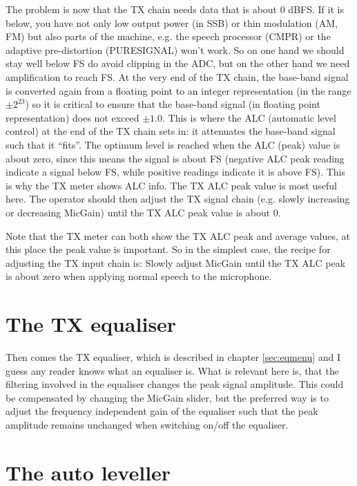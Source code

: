 \documentclass[12pt]{book}
\begin{document}
The problem is now that the TX chain needs data that is about 0 dBFS. If it is below, you have not only
low output power (in SSB) or thin modulation (AM, FM) but also parts of the machine, e.g. the speech
processor (CMPR) or the adaptive pre-distortion (PURESIGNAL) won't work.
So on one hand we should stay
well below FS do avoid clipping in the ADC, but on the other hand we need amplification to reach FS.
At the very end of the TX chain, the base-band signal is converted again from a floating point
to an integer representation (in the range $\pm 2^{23}$) so it is critical to ensure that the base-band
signal (in floating point representation) does not exceed $\pm 1.0$. This is where the ALC (automatic
level control) at the end of the TX chain sets in: it attenuates the base-band signal such that it
``fits''. The optimum level is reached when the ALC (peak) value is about zero, since this means
the signal is about FS (negative ALC peak reading indicate a signal below FS, while positive readings
indicate it is above FS).
This is why the TX meter shows ALC info. The TX ALC peak value is most useful here.  The operator should then adjust
the TX signal chain (e.g. slowly increasing or decreasing  MicGain) until the TX ALC peak value is about 0.

Note that the TX meter can both show the TX ALC peak and average values, at this place the peak value
is important. So in the simplest case, the recipe for adjusting the TX input chain is:
{\color{red} Slowly adjust MicGain until the TX ALC peak is about zero when applying normal speech to the
microphone.}

\section{The TX equaliser}

Then comes the TX equaliser, which is described in chapter \ref{sec:eqmenu} and I guess any reader knows what
an equaliser is. What is relevant here is, that the filtering
involved in the equaliser changes the peak signal amplitude. This could be compensated
by changing the MicGain slider, but the preferred way is to adjust the frequency independent gain
of the equaliser such that the peak amplitude remains unchanged when switching on/off the equaliser.

\section{The auto leveller}
\end{document}
